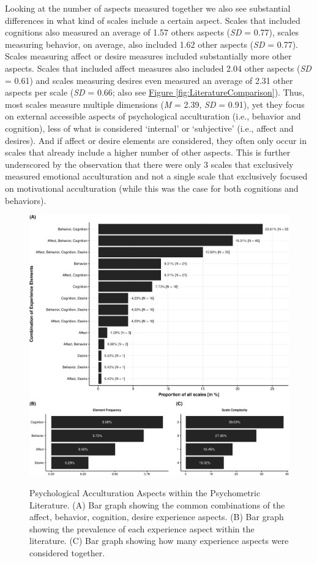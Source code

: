 \documentclass[man, 12pt, a4paper, mask]{apa7}
\newcommand{\fgrref}[2][]{\hyperref[#2]{Figure \ref*{#2}#1}}
\begin{document}
Looking at the number of aspects measured together we also see
substantial differences in what kind of scales include a certain aspect.
Scales that included cognitions also measured an average of 1.57 others
aspects (\textit{SD} = 0.77), scales measuring behavior, on average,
also included 1.62 other aspects (\textit{SD} = 0.77). Scales measuring
affect or desire measures included substantially more other aspects.
Scales that included affect measures also included 2.04 other aspects
(\textit{SD} = 0.61) and scales measuring desires even measured an
average of 2.31 other aspects per scale (\textit{SD} = 0.66; also see
\fgrref{fig:LiteratureComparison}). Thus, most scales measure multiple
dimensions (\textit{M} = 2.39, \textit{SD} = 0.91), yet they focus on
external accessible aspects of psychological acculturation (i.e.,
behavior and cognition), less of what is considered `internal' or
`subjective' (i.e., affect and desires). And if affect or desire
elements are considered, they often only occur in scales that already
include a higher number of other aspects. This is further underscored by
the observation that there were only 3 scales that exclusively measured
emotional acculturation and not a single scale that exclusively focused
on motivational acculturation (while this was the case for both
cognitions and behaviors).

\begin{figure}[h]
\centering
\caption{Psychological Acculturation Aspects within the Psychometric Literature. (A) Bar graph showing the common combinations of the affect, behavior, cognition, desire experience aspects. (B) Bar graph showing the prevalence of each experience aspect within the literature. (C) Bar graph showing how many experience aspects were considered together.}
\includegraphics[width=\textwidth]{Figures/ABCDFreq-1}
\label{fig:ElementsScales}
\end{figure}
\end{document}
